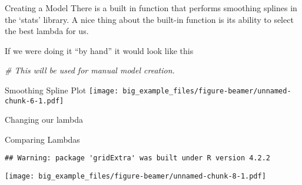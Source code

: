 \documentclass[
  ignorenonframetext,
]{beamer}
\newenvironment{Shaded}{\begin{snugshade}}{\end{snugshade}}
\newcommand{\AttributeTok}[1]{\textcolor[rgb]{0.77,0.63,0.00}{#1}}
\newcommand{\CommentTok}[1]{\textcolor[rgb]{0.56,0.35,0.01}{\textit{#1}}}
\newcommand{\DecValTok}[1]{\textcolor[rgb]{0.00,0.00,0.81}{#1}}
\newcommand{\FloatTok}[1]{\textcolor[rgb]{0.00,0.00,0.81}{#1}}
\newcommand{\FunctionTok}[1]{\textcolor[rgb]{0.00,0.00,0.00}{#1}}
\newcommand{\NormalTok}[1]{#1}
\newcommand{\OtherTok}[1]{\textcolor[rgb]{0.56,0.35,0.01}{#1}}
\newcommand{\SpecialCharTok}[1]{\textcolor[rgb]{0.00,0.00,0.00}{#1}}
\begin{document}
\begin{frame}[fragile]{Creating a Model}
\protect\hypertarget{creating-a-model}{}
There is a built in function that performs smoothing splines in the
`stats' library. A nice thing about the built-in function is its ability
to select the best lambda for us.

\begin{Shaded}
\end{Shaded}

If we were doing it ``by hand'' it would look like this

\begin{Shaded}
\begin{Highlighting}[]
\CommentTok{\# This will be used for manual model creation.}
\end{Highlighting}
\end{Shaded}
\end{frame}

\begin{frame}{Smoothing Spline Plot}
\protect\hypertarget{smoothing-spline-plot}{}
\texttt{[image: big\_example\_files/figure-beamer/unnamed-chunk-6-1.pdf]}
\end{frame}

\begin{frame}[fragile]{Changing our lambda}
\protect\hypertarget{changing-our-lambda}{}
\begin{Shaded}
\end{Shaded}
\end{frame}

\begin{frame}[fragile]{Comparing Lambdas}
\protect\hypertarget{comparing-lambdas}{}
\begin{verbatim}
## Warning: package 'gridExtra' was built under R version 4.2.2
\end{verbatim}

\texttt{[image: big\_example\_files/figure-beamer/unnamed-chunk-8-1.pdf]}
\end{frame}
\end{document}
